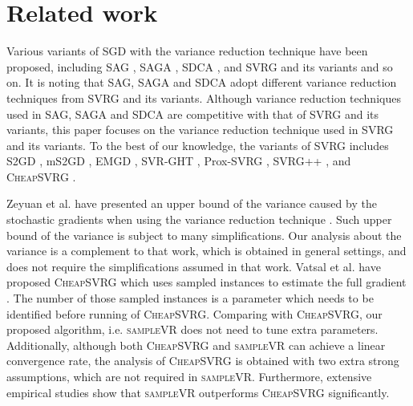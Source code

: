 \documentclass[letterpaper]{article}
\begin{document}
 

\section{Related work}
\label{sect_related_work}
Various variants of  SGD with the variance reduction technique have been proposed, including SAG \cite{Schmidt:2013ui}, SAGA \cite{Defazio:2014vu}, SDCA \cite{ShalevShwartz:2015vw}, and SVRG \cite{Johnson:9MAvkbgy} and its variants and so on. It is noting that SAG, SAGA and SDCA adopt different variance reduction techniques from SVRG and its variants. Although variance reduction techniques used in SAG, SAGA and SDCA are competitive with that of SVRG and its variants,  this paper focuses on the variance reduction technique used in SVRG and its variants. To the best of our knowledge,  the variants of SVRG includes S2GD \cite{Richtarik:2013te}, mS2GD \cite{Liu:2015bx}, EMGD \cite{Zhang2013Linear}, SVR-GHT \cite{Li:2016vh}, Prox-SVRG \cite{Xiao:2014vw}, SVRG++ \cite{Allen2015Improved}, and \textsc{CheapSVRG} \cite{Shah2016Trading}. 

Zeyuan et al. have presented an upper bound of the variance caused by the stochastic gradients when using the variance reduction technique \cite{AllenZhu:2016up}. Such upper bound of the variance is subject to  many simplifications. Our analysis about the variance is a complement to that work, which is obtained in general settings, and does not require the simplifications assumed in that work. Vatsal et al. have proposed \textsc{CheapSVRG} which uses sampled instances to estimate the full gradient \cite{Shah2016Trading}. The number of those sampled instances is a parameter which needs to be identified before running of \textsc{CheapSVRG}. Comparing with \textsc{CheapSVRG}, our proposed algorithm, i.e. \textsc{sampleVR} does not need to tune extra parameters. Additionally, although both \textsc{CheapSVRG} and \textsc{sampleVR} can achieve a linear convergence rate, the analysis of \textsc{CheapSVRG} is obtained with two extra strong assumptions, which are not required in \textsc{sampleVR}. Furthermore, extensive empirical studies show that  \textsc{sampleVR} outperforms \textsc{CheapSVRG} significantly.
 
\end{document}
